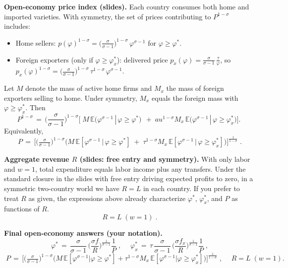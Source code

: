 \begin{solution}
\bigskip
	\textbf{Open-economy price index (slides).}
Each country consumes both home and imported varieties. With symmetry, the set of prices contributing to $P^{1-\sigma}$ includes:
\begin{itemize}
	\item Home sellers: $p(\varphi)^{1-\sigma}=\big(\tfrac{\sigma}{\sigma-1}\big)^{1-\sigma}\,\varphi^{\sigma-1}$ for $\varphi\ge \varphi^*$.
	\item Foreign exporters (only if $\varphi\ge \varphi_x^*$): delivered price $p_x(\varphi)=\tfrac{\sigma}{\sigma-1}\,\tfrac{\tau}{\varphi}$, so $p_x(\varphi)^{1-\sigma}=\big(\tfrac{\sigma}{\sigma-1}\big)^{1-\sigma}\,\tau^{1-\sigma}\,\varphi^{\sigma-1}$.
\end{itemize}
Let $M$ denote the mass of active home firms and $M_x$ the mass of foreign exporters selling to home. Under symmetry, $M_x$ equals the foreign mass with $\varphi\ge \varphi_x^*$. Then
\[
P^{1-\sigma} \,=\, \Big(\frac{\sigma}{\sigma-1}\Big)^{1-\sigma} \bigg[\; M\, \mathbb{E}\big(\varphi^{\sigma-1}\,|\,\varphi\ge \varphi^*\big) \,\; +\; 
	au^{1-\sigma} M_x\, \mathbb{E}\big(\varphi^{\sigma-1}\,|\,\varphi\ge \varphi_x^*\big) \bigg].
\]
Equivalently,
\[
\boxed{\;\displaystyle P \,=\, \Bigg[ \Big(\tfrac{\sigma}{\sigma-1}\Big)^{1-\sigma}\Big( M\, \mathbb{E}[\varphi^{\sigma-1}\,|\,\varphi\ge \varphi^*] 
\; +\; \tau^{1-\sigma} M_x\, \mathbb{E}[\varphi^{\sigma-1}\,|\,\varphi\ge \varphi_x^*]\Big) \Bigg]^{\!\tfrac{1}{1-\sigma}}\; }.
\]

\bigskip
	\textbf{Aggregate revenue $R$ (slides: free entry and symmetry).}
With only labor and $w=1$, total expenditure equals labor income plus any transfers. Under the standard closure in the slides with free entry driving expected profits to zero, in a symmetric two-country world we have $R=L$ in each country. If you prefer to treat $R$ as given, the expressions above already characterize $\varphi^*$, $\varphi_x^*$, and $P$ as functions of $R$.
\[
\boxed{\; R = L \; (w=1)\; }.
\]

\bigskip
	\textbf{Final open-economy answers (your notation).}
\[
\boxed{\;\displaystyle \varphi^* \,=\, \frac{\sigma}{\sigma-1}\,\Big(\frac{\sigma f}{R}\Big)^{\!\tfrac{1}{\sigma-1}} \frac{1}{P}\; },\quad
\boxed{\;\displaystyle \varphi_x^* \,=\, \tau\, \frac{\sigma}{\sigma-1}\,\Big(\frac{\sigma f_x}{R}\Big)^{\!\tfrac{1}{\sigma-1}} \frac{1}{P}\; },
\]
\[
\boxed{\;\displaystyle P \,=\, \Bigg[ \Big(\tfrac{\sigma}{\sigma-1}\Big)^{1-\sigma}\Big( M\, \mathbb{E}[\varphi^{\sigma-1}|\varphi\ge \varphi^*] + \tau^{1-\sigma} M_x\, \mathbb{E}[\varphi^{\sigma-1}|\varphi\ge \varphi_x^*] \Big) \Bigg]^{\!\tfrac{1}{1-\sigma}}\; },\quad
\boxed{\; R = L\; (w=1) }.

\]
\end{solution}
